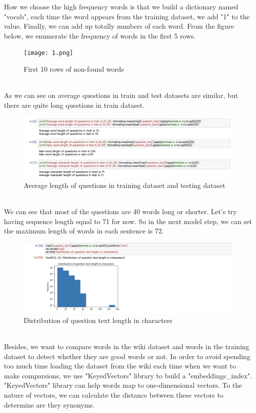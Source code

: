 \documentclass{article}
\begin{document}
\noindent How we choose the high frequency words is that we build a dictionary named "vocab", each time the word appears from the training dataset, we add "1" to the value. Finally, we can add up totally numbers of each word. From the figure below, we 
enumerate the frequency of words in the first 5 rows.\\
\begin{figure}[h]
	\centering
	\texttt{[image: 1.png]}
	\caption{ First 10 rows of non-found words}
\end{figure}\\
\noindent As we can see on average questions in train and test datasets are similar, but there are quite long questions in train dataset.\\
\begin{figure}[h]
	\centering
	\includegraphics[scale = 0.15]{n2.jpeg}
	\caption{Average length of questions in training dataset and testing dataset}
\end{figure}\\
\noindent We can see that most of the questions are 40 words long or shorter. Let's try having sequence length equal to 71 for now. So in the next model step, we can set the maximum length of words in each sentence is 72.\\
\begin{figure}[h]
	\centering
	\includegraphics[scale = 0.15]{n3.jpeg}
	\caption{Distribution of question text length in characters}
\end{figure}\\
\noindent Besides, we want to compare words in the wiki dataset and words in the training dataset to detect whether they are good words  or not. In order to avoid spending too much time loading the dataset from the wiki each time when we want to make comparsions, we use "KeyedVectors" library to build a "embeddings\_index". "KeyedVectors" library can help words map to one-dimensional vectors. To the nature of vectors, we can calculate the distance between these vectors to determine are they synonyms.\\
\end{document}
